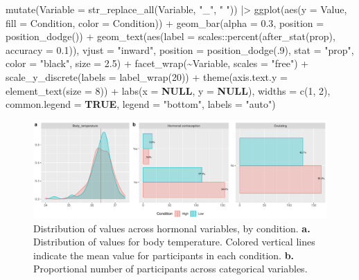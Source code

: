 \documentclass[
  bookmarksnumbered]{article}
\newenvironment{Shaded}{\begin{snugshade}}{\end{snugshade}}
\newcommand{\AttributeTok}[1]{\textcolor[rgb]{0.80,0.80,0.80}{#1}}
\newcommand{\ConstantTok}[1]{\textcolor[rgb]{0.86,0.64,0.64}{\textbf{#1}}}
\newcommand{\DecValTok}[1]{\textcolor[rgb]{0.86,0.86,0.80}{#1}}
\newcommand{\FloatTok}[1]{\textcolor[rgb]{0.75,0.75,0.82}{#1}}
\newcommand{\FunctionTok}[1]{\textcolor[rgb]{0.94,0.94,0.56}{#1}}
\newcommand{\NormalTok}[1]{\textcolor[rgb]{0.80,0.80,0.80}{#1}}
\newcommand{\SpecialCharTok}[1]{\textcolor[rgb]{0.86,0.64,0.64}{#1}}
\newcommand{\StringTok}[1]{\textcolor[rgb]{0.80,0.58,0.58}{#1}}
\begin{document}
\begin{Shaded}
\begin{Highlighting}[]
    \FunctionTok{mutate}\NormalTok{(}\AttributeTok{Variable =} \FunctionTok{str\_replace\_all}\NormalTok{(Variable, }\StringTok{"\_"}\NormalTok{, }\StringTok{" "}\NormalTok{)) }\SpecialCharTok{|\textgreater{}}
    \FunctionTok{ggplot}\NormalTok{(}\FunctionTok{aes}\NormalTok{(}\AttributeTok{y =}\NormalTok{ Value, }\AttributeTok{fill =}\NormalTok{ Condition, }\AttributeTok{color =}\NormalTok{ Condition)) }\SpecialCharTok{+}
    \FunctionTok{geom\_bar}\NormalTok{(}\AttributeTok{alpha =} \FloatTok{0.3}\NormalTok{, }\AttributeTok{position =} \FunctionTok{position\_dodge}\NormalTok{()) }\SpecialCharTok{+}
    \FunctionTok{geom\_text}\NormalTok{(}\FunctionTok{aes}\NormalTok{(}\AttributeTok{label =}\NormalTok{ scales}\SpecialCharTok{::}\FunctionTok{percent}\NormalTok{(}\FunctionTok{after\_stat}\NormalTok{(prop), }\AttributeTok{accuracy =} \FloatTok{0.1}\NormalTok{)),}
      \AttributeTok{vjust =} \StringTok{"inward"}\NormalTok{,}
      \AttributeTok{position =} \FunctionTok{position\_dodge}\NormalTok{(.}\DecValTok{9}\NormalTok{),}
      \AttributeTok{stat =} \StringTok{"prop"}\NormalTok{,}
      \AttributeTok{color =} \StringTok{"black"}\NormalTok{,}
      \AttributeTok{size =} \FloatTok{2.5}\NormalTok{) }\SpecialCharTok{+}
    \FunctionTok{facet\_wrap}\NormalTok{(}\SpecialCharTok{\textasciitilde{}}\NormalTok{Variable, }\AttributeTok{scales =} \StringTok{"free"}\NormalTok{) }\SpecialCharTok{+}
    \FunctionTok{scale\_y\_discrete}\NormalTok{(}\AttributeTok{labels =} \FunctionTok{label\_wrap}\NormalTok{(}\DecValTok{20}\NormalTok{)) }\SpecialCharTok{+}
    \FunctionTok{theme}\NormalTok{(}\AttributeTok{axis.text.y =} \FunctionTok{element\_text}\NormalTok{(}\AttributeTok{size =} \DecValTok{8}\NormalTok{)) }\SpecialCharTok{+}
    \FunctionTok{labs}\NormalTok{(}\AttributeTok{x =} \ConstantTok{NULL}\NormalTok{, }\AttributeTok{y =} \ConstantTok{NULL}\NormalTok{),}
  \AttributeTok{widths =} \FunctionTok{c}\NormalTok{(}\DecValTok{1}\NormalTok{, }\DecValTok{2}\NormalTok{),}
  \AttributeTok{common.legend =} \ConstantTok{TRUE}\NormalTok{,}
  \AttributeTok{legend =} \StringTok{"bottom"}\NormalTok{,}
  \AttributeTok{labels =} \StringTok{"auto"}\NormalTok{)}
\end{Highlighting}
\end{Shaded}

\begin{figure}
\centering
\includegraphics{Supplementary_material_files/figure-latex/hormone-desc-plot-1.pdf}
\caption{\label{fig:hormone-desc-plot}Distribution of values across hormonal variables, by condition. \textbf{a.} Distribution of values for body temperature. Colored vertical lines indicate the mean value for participants in each condition. \textbf{b.} Proportional number of participants across categorical variables.}
\end{figure}
\end{document}
